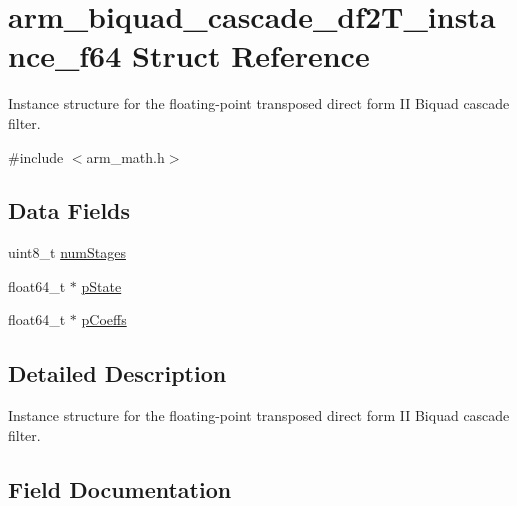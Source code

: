 \hypertarget{structarm__biquad__cascade__df2_t__instance__f64}{}\section{arm\+\_\+biquad\+\_\+cascade\+\_\+df2\+T\+\_\+instance\+\_\+f64 Struct Reference}
\label{structarm__biquad__cascade__df2_t__instance__f64}


Instance structure for the floating-\/point transposed direct form II Biquad cascade filter.  




{\ttfamily \#include $<$arm\+\_\+math.\+h$>$}

\subsection*{Data Fields}
\begin{DoxyCompactItemize}
\item 
uint8\+\_\+t \mbox{\hyperlink{structarm__biquad__cascade__df2_t__instance__f64_a3615af038f56917909e0370c11bc2ec7}{num\+Stages}}
\item 
float64\+\_\+t $\ast$ \mbox{\hyperlink{structarm__biquad__cascade__df2_t__instance__f64_ae97c926a7e3a4bfe26fcdd0a3cc2f5c6}{p\+State}}
\item 
float64\+\_\+t $\ast$ \mbox{\hyperlink{structarm__biquad__cascade__df2_t__instance__f64_a2f5f42f60a50d7cb39837fd9b80cd8f0}{p\+Coeffs}}
\end{DoxyCompactItemize}


\subsection{Detailed Description}
Instance structure for the floating-\/point transposed direct form II Biquad cascade filter. 

\subsection{Field Documentation}
\mbox{\label{structarm__biquad__cascade__df2_t__instance__f64_a3615af038f56917909e0370c11bc2ec7}} 
